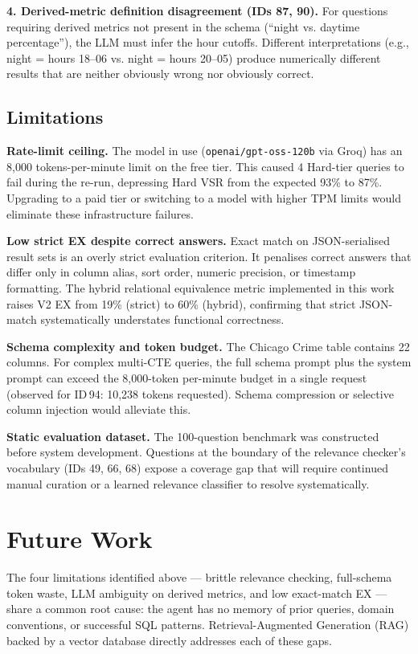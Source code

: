 \textbf{4. Derived-metric definition disagreement (IDs 87, 90).}
For questions requiring derived metrics not present in the schema (``night vs.
daytime percentage''), the LLM must infer the hour cutoffs. Different
interpretations (e.g., night = hours 18–06 vs. night = hours 20–05) produce
numerically different results that are neither obviously wrong nor obviously
correct.

\subsection{Limitations}

\textbf{Rate-limit ceiling.}
The model in use (\texttt{openai/gpt-oss-120b} via Groq) has an 8,000
tokens-per-minute limit on the free tier. This caused 4 Hard-tier queries to
fail during the re-run, depressing Hard VSR from the expected 93\% to 87\%.
Upgrading to a paid tier or switching to a model with higher TPM limits would
eliminate these infrastructure failures.

\textbf{Low strict EX despite correct answers.}
Exact match on JSON-serialised result sets is an overly strict evaluation
criterion. It penalises correct answers that differ only in column alias, sort
order, numeric precision, or timestamp formatting. The hybrid relational
equivalence metric implemented in this work raises V2 EX from 19\% (strict)
to 60\% (hybrid), confirming that strict JSON-match systematically understates
functional correctness.

\textbf{Schema complexity and token budget.}
The Chicago Crime table contains 22 columns. For complex multi-CTE queries, the
full schema prompt plus the system prompt can exceed the 8,000-token per-minute
budget in a single request (observed for ID\,94: 10,238 tokens requested).
Schema compression or selective column injection would alleviate this.

\textbf{Static evaluation dataset.}
The 100-question benchmark was constructed before system development. Questions
at the boundary of the relevance checker's vocabulary (IDs 49, 66, 68) expose a
coverage gap that will require continued manual curation or a learned relevance
classifier to resolve systematically.

\section{Future Work}

The four limitations identified above — brittle relevance checking, full-schema
token waste, LLM ambiguity on derived metrics, and low exact-match EX — share a
common root cause: the agent has no memory of prior queries, domain conventions,
or successful SQL patterns.  Retrieval-Augmented Generation (RAG) backed by a
vector database directly addresses each of these gaps.

